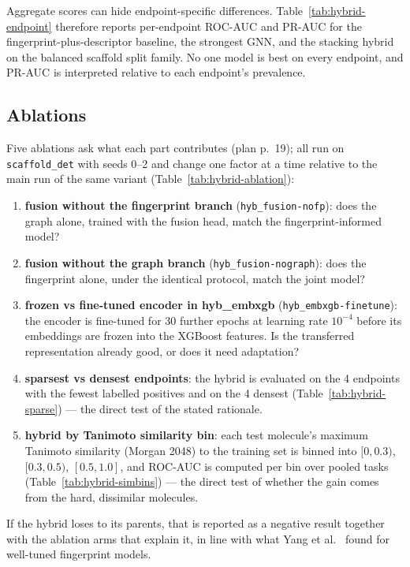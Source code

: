 

Aggregate scores can hide endpoint-specific differences. Table~\ref{tab:hybrid-endpoint}
therefore reports per-endpoint ROC-AUC and PR-AUC for the fingerprint-plus-descriptor
baseline, the strongest GNN, and the stacking hybrid on the balanced scaffold split family.
No one model is best on every endpoint, and PR-AUC is interpreted relative to each
endpoint's prevalence.

\subsection{Ablations}
\label{sec:hybrid-ablation}
Five ablations ask what each part contributes (plan p.~19); all run on
\texttt{scaffold\_det} with seeds 0--2 and change one factor at a time relative to the
main run of the same variant (Table~\ref{tab:hybrid-ablation}):

\begin{enumerate}
\item \textbf{fusion without the fingerprint branch} (\texttt{hyb\_fusion-nofp}): does the
graph alone, trained with the fusion head, match the fingerprint-informed model?
\item \textbf{fusion without the graph branch} (\texttt{hyb\_fusion-nograph}): does the
fingerprint alone, under the identical protocol, match the joint model?
\item \textbf{frozen vs fine-tuned encoder in hyb\_embxgb} (\texttt{hyb\_embxgb-finetune}):
the encoder is fine-tuned for 30 further epochs at learning rate $10^{-4}$ before its
embeddings are frozen into the XGBoost features. Is the transferred representation already
good, or does it need adaptation?
\item \textbf{sparsest vs densest endpoints}: the hybrid is evaluated on the 4 endpoints
with the fewest labelled positives and on the 4 densest
(Table~\ref{tab:hybrid-sparse}) --- the direct test of the stated rationale.
\item \textbf{hybrid by Tanimoto similarity bin}: each test molecule's maximum Tanimoto
similarity (Morgan 2048) to the training set is binned into $[0,0.3)$, $[0.3,0.5)$,
$[0.5,1.0]$, and ROC-AUC is computed per bin over pooled tasks
(Table~\ref{tab:hybrid-simbins}) --- the direct test of whether the gain comes from the
hard, dissimilar molecules.
\end{enumerate}

If the hybrid loses to its parents, that is reported as a negative result together with the
ablation arms that explain it, in line with what Yang et al.~\cite{yang2019analyzing}
found for well-tuned fingerprint models.
